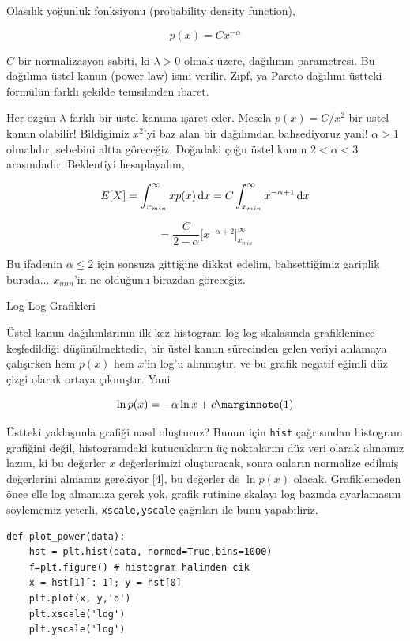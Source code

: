 \documentclass[12pt,fleqn]{article}\usepackage{../../common}
\begin{document}
Olasılık yoğunluk fonksiyonu (probability density function),

$$ p(x) = C x^{-\alpha}  $$

$C$ bir normalizasyon sabiti, ki $\lambda > 0$ olmak üzere, dağılımın
parametresi. Bu dağılıma üstel kanun (power law) ismi verilir. Zıpf, ya
Pareto dağılımı üstteki formülün farklı şekilde temsilinden ibaret. 

Her özgün $\lambda$ farklı bir üstel kanuna işaret eder. Mesela $p(x) = C/
x^2$ bir ustel kanun olabilir! Bildigimiz $x^2$'yi baz alan bir dağılımdan
bahsediyoruz yani! $\alpha > 1$ olmalıdır, sebebini altta
göreceğiz. Doğadaki çoğu üstel kanun $2 < \alpha < 3$
arasındadır. Beklentiyi hesaplayalım,

$$ 
E[X] = \int_{x_{min}}^{\infty} x p(x) \,\mathrm{d} x  = 
C \int_{x_{min}}^{\infty} x ^{-\alpha + 1} \,\mathrm{d} x
$$

$$ = \frac{C}{2-\alpha} \bigg[ x ^{-\alpha+2}  \bigg]_{x_{min}}^{\infty} $$

Bu ifadenin $\alpha \le 2$ için sonsuza gittiğine dikkat edelim,
bahsettiğimiz gariplik burada... $x_{min}$'in ne olduğunu birazdan göreceğiz.

Log-Log Grafikleri

Üstel kanun dağılımlarının ilk kez histogram log-log skalasında
grafiklenince keşfedildiği düşünülmektedir, bir üstel kanun sürecinden
gelen veriyi anlamaya çalışırken hem $p(x)$ hem $x$'in log'u alınmıştır, ve
bu grafik negatif eğimli düz çizgi olarak ortaya çıkmıştır. Yani

$$ 
\ln p(x) = -\alpha \ln x + c 
\mlabel{1}
$$

Üstteki yaklaşımla grafiği nasıl oluşturuz? Bunun için \verb!hist!
çağrısından histogram grafiğini değil, histogramdaki kutucukların üç
noktalarını düz veri olarak almamız lazım, ki bu değerler $x$ değerlerimizi
oluşturacak, sonra onların normalize edilmiş değerlerini almamız gerekiyor
[4], bu değerler de $\ln p(x)$ olacak. Grafiklemeden önce elle log almamıza
gerek yok, grafik rutinine skalayı log bazında ayarlamasını söylememiz
yeterli, \verb!xscale,yscale! çağrıları ile bunu yapabiliriz.

\begin{verbatim}
def plot_power(data):
    hst = plt.hist(data, normed=True,bins=1000)
    f=plt.figure() # histogram halinden cik
    x = hst[1][:-1]; y = hst[0]
    plt.plot(x, y,'o')
    plt.xscale('log')
    plt.yscale('log')
\end{verbatim}
\end{document}
